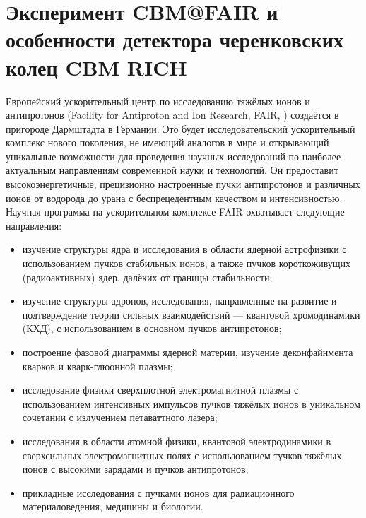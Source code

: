 \chapter{Эксперимент CBM@FAIR и особенности детектора черенковских колец CBM RICH}\label{sec:secCbm}




Европейский ускорительный центр по исследованию тяжёлых ионов и антипротонов (Facility for Antiproton and Ion Research, FAIR, \cite{FAIR}) создаётся в пригороде Дармштадта в Германии. Это будет исследовательский ускорительный комплекс нового поколения, не имеющий аналогов в мире и открывающий уникальные возможности для проведения научных исследований по наиболее актуальным направлениям современной науки и технологий. Он предоставит высокоэнергетичные, прецизионно настроенные пучки антипротонов и различных ионов от водорода до урана с беспрецедентным качеством и интенсивностью.
Научная программа на ускорительном комплексе FAIR охватывает следующие направления:
\begin{itemize}
\item изучение структуры ядра и исследования в области ядерной астрофизики с использованием пучков стабильных ионов, а также пучков короткоживущих (радиоактивных) ядер, далёких от границы стабильности;
\item изучение структуры адронов, исследования, направленные на развитие и подтверждение теории сильных взаимодействий --- квантовой хромодинамики (КХД), с использованием в основном пучков антипротонов;
\item построение фазовой диаграммы ядерной материи, изучение деконфайнмента кварков и кварк-глюонной плазмы;
\item исследование физики сверхплотной электромагнитной плазмы с использованием интенсивных импульсов пучков тяжёлых ионов в уникальном сочетании с излучением петаваттного лазера;
\item исследования в области атомной физики, квантовой электродинамики в сверхсильных электромагнитных полях с использованием тучков тяжёлых ионов с высокими зарядами и пучков антипротонов;
\item прикладные исследования с пучками ионов для радиационного материаловедения, медицины и биологии.
\end{itemize}

